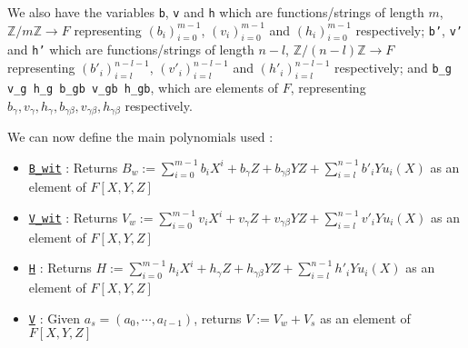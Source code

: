 \documentclass{article}
\theoremstyle{definition}
\theoremstyle{remark}
\begin{document}
We also have the variables \texttt{b}, \texttt{v} and \texttt{h} which are functions/strings of length $m$, $\mathbb{Z}/m \mathbb{Z} \to F$ representing $(b_i)_{i = 0}^{m - 1}$, $(v_i)_{i = 0}^{m - 1}$ and $(h_i)_{i = 0}^{m - 1}$ respectively; 
\texttt{b'}, \texttt{v'} and \texttt{h'} which are functions/strings of length $n - l$, $\mathbb{Z}/(n - l) \mathbb{Z} \to F$ representing $(b'_i)_{i = l}^{n - l - 1}$, $(v'_i)_{i = l}^{n - l - 1}$ and $(h'_i)_{i = l}^{n - l - 1}$ respectively; and 
\texttt{b\_g v\_g h\_g b\_gb v\_gb h\_gb}, which are elements of $F$, representing $b_{\gamma}, v_{\gamma}, h_{\gamma}, b_{\gamma \beta}, v_{\gamma \beta}, h_{\gamma \beta}$ respectively.

We can now define the main polynomials used :
\begin{itemize}
  \item \href{https://github.com/BoltonBailey/formal-snarks-project/blob/7fd9cd122f5887f88f6a706b4f2a68a7153c7381/src/snarks/babysnark/knowledge_soundness.lean#L177}{\texttt{B\_wit}} : Returns $B_w := \sum_{i = 0}^{m - 1} b_i X^i + b_{\gamma}Z + b_{\gamma \beta}YZ + \sum_{i = l}^{n - 1} b'_{i} Y u_{i}(X)$ as an element of $F[X, Y, Z]$
  \item \href{https://github.com/BoltonBailey/formal-snarks-project/blob/7fd9cd122f5887f88f6a706b4f2a68a7153c7381/src/snarks/babysnark/knowledge_soundness.lean#L186}{\texttt{V\_wit}} : Returns $V_w := \sum_{i = 0}^{m - 1} v_i X^i + v_{\gamma}Z + v_{\gamma \beta}YZ + \sum_{i = l}^{n - 1} v'_{i} Y u_{i}(X)$ as an element of $F[X, Y, Z]$
  \item \href{https://github.com/BoltonBailey/formal-snarks-project/blob/7fd9cd122f5887f88f6a706b4f2a68a7153c7381/src/snarks/babysnark/knowledge_soundness.lean#L195}{\texttt{H}} : Returns $H := \sum_{i = 0}^{m - 1} h_i X^i + h_{\gamma}Z + h_{\gamma \beta}YZ + \sum_{i = l}^{n - 1} h'_{i} Y u_{i}(X)$ as an element of $F[X, Y, Z]$
  \item \href{https://github.com/BoltonBailey/formal-snarks-project/blob/7fd9cd122f5887f88f6a706b4f2a68a7153c7381/src/snarks/babysnark/knowledge_soundness.lean#L206}{\texttt{V}} : Given $a_s = (a_0, \cdots, a_{l - 1})$, returns $V := V_w + V_s$ as an element of $F[X, Y, Z]$
\end{itemize}
\end{document}
